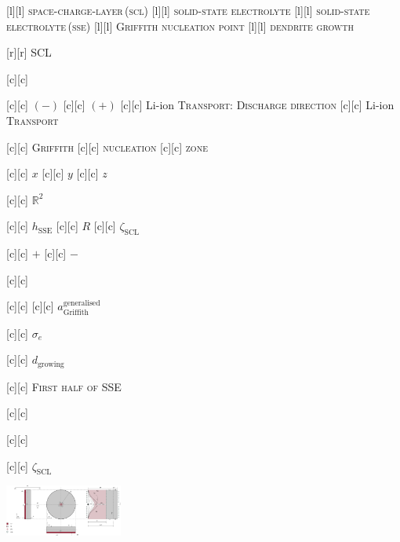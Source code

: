 [l][l] {\scriptsize \textsc{space-charge-layer\,(scl)}}
[l][l]  {\scriptsize \textsc{solid-state electrolyte}}
[l][l]  {\scriptsize \textsc{solid-state electrolyte\,(sse)}}
[l][l] {\scriptsize \textsc{Griffith nucleation point}}
[l][l] {\scriptsize \textsc{dendrite growth}}

[r][r]  {\tiny \textsc{SCL}}

[c][c] {}

[c][c] {\tiny $(-)$}
[c][c] {\tiny $(+)$}
[c][c] {\tiny Li-ion \textsc{Transport}: \textsc{Discharge direction}}
[c][c] {\scriptsize Li-ion \textsc{Transport}}

[c][c]   {\scriptsize \textsc{Griffith}}
[c][c] {\scriptsize \textsc{nucleation}}
[c][c] {\scriptsize \textsc{zone}}

[c][c] {\tiny $x$}
[c][c] {\tiny $y$}
[c][c] {\tiny $z$}

[c][c] {\tiny $\mathbb{R}^{2}$}

[c][c]  {\scriptsize $h_{\text{SSE}}$}
[c][c] {\scriptsize $R$}
[c][c] {\scriptsize $\zeta_{\text{SCL}}$}

[c][c]  {\tiny $+$}
[c][c]  {\tiny $-$}

[c][c]  {}

[c][c] {}
[c][c]  {\tiny $a^{\text{generalised}}_{\text{Griffith}}$}

[c][c] {\scriptsize $\sigma_{e}$}

[c][c]  {\tiny $d_{\text{growing}}$}

[c][c]  {\tiny \textsc{First half of SSE}}

[c][c] {}

[c][c]  {}

[c][c]  {\scriptsize $\zeta_{\text{SCL}}$}

\includegraphics[width=0.29\textwidth]{space_charge_layer_merged.eps}